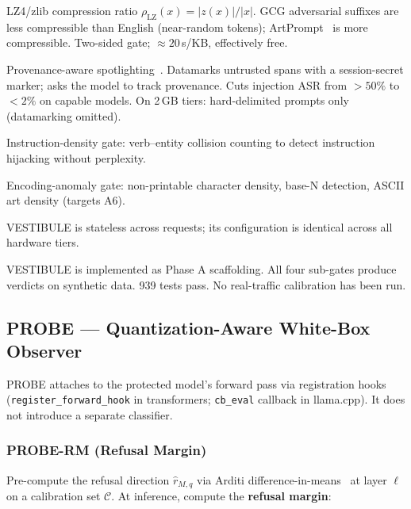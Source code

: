 \documentclass[11pt,a4paper]{article}
\newcommand{\rhat}{\hat{r}}
\begin{document}
\begin{description}[leftmargin=2em, itemsep=2pt]
  \item[VESTIBULE-LZ] LZ4/zlib compression ratio $\rho_\text{LZ}(x) = |z(x)|/|x|$.
        GCG adversarial suffixes are less compressible than English (near-random tokens);
        ArtPrompt~\citep{artprompt2024} is more compressible.
        Two-sided gate; ${\approx}20$\,\textmu s/KB, effectively free.
  \item[VESTIBULE-PS] Provenance-aware spotlighting~\citep{hines2024spotlighting}.
        Datamarks untrusted spans with a session-secret marker; asks the model to track
        provenance. Cuts injection ASR from $> 50\%$ to $< 2\%$ on capable models.
        On 2\,GB tiers: hard-delimited prompts only (datamarking omitted).
  \item[VESTIBULE-ID] Instruction-density gate: verb--entity collision counting to detect
        instruction hijacking without perplexity.
  \item[VESTIBULE-EA] Encoding-anomaly gate: non-printable character density, base-N
        detection, ASCII art density (targets A6).
\end{description}

VESTIBULE is stateless across requests; its configuration is identical across all
hardware tiers.

\begin{scaffoldbox}
VESTIBULE is implemented as Phase A scaffolding. All four sub-gates produce verdicts
on synthetic data. 939 tests pass. No real-traffic calibration has been run.
\end{scaffoldbox}

\subsection{PROBE — Quantization-Aware White-Box Observer}

PROBE attaches to the protected model's forward pass via registration hooks
(\texttt{register\_forward\_hook} in transformers; \texttt{cb\_eval} callback in
llama.cpp).
It does not introduce a separate classifier.

\subsubsection*{PROBE-RM (Refusal Margin)}

Pre-compute the refusal direction $\rhat_{M,q}$ via Arditi difference-in-means~\citep{arditi2024refusal}
at layer $\ell$ on a calibration set $\mathcal{C}$.
At inference, compute the \textbf{refusal margin}:
\end{document}
